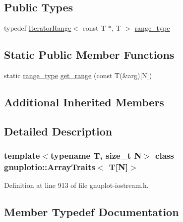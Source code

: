 \subsection*{Public Types}
\begin{DoxyCompactItemize}
\item 
typedef \hyperlink{classgnuplotio_1_1_iterator_range}{Iterator\+Range}$<$ const T $\ast$, T $>$ \hyperlink{classgnuplotio_1_1_array_traits_3_01_t[_n]_4_a926f3c3d14fbe82aab7b70ccc16d20fb}{range\+\_\+type}
\end{DoxyCompactItemize}
\subsection*{Static Public Member Functions}
\begin{DoxyCompactItemize}
\item 
static \hyperlink{classgnuplotio_1_1_array_traits_3_01_t[_n]_4_a926f3c3d14fbe82aab7b70ccc16d20fb}{range\+\_\+type} \hyperlink{classgnuplotio_1_1_array_traits_3_01_t[_n]_4_adc9c1ce6da4923418f367e08c150a928}{get\+\_\+range} (const T(\&arg)\mbox{[}N\mbox{]})
\end{DoxyCompactItemize}
\subsection*{Additional Inherited Members}


\subsection{Detailed Description}
\subsubsection*{template$<$typename T, size\+\_\+t N$>$\newline
class gnuplotio\+::\+Array\+Traits$<$ T\mbox{[}\+N\mbox{]}$>$}



Definition at line 913 of file gnuplot-\/iostream.\+h.



\subsection{Member Typedef Documentation}
\mbox{\label{classgnuplotio_1_1_array_traits_3_01_t[_n]_4_a926f3c3d14fbe82aab7b70ccc16d20fb}} 
